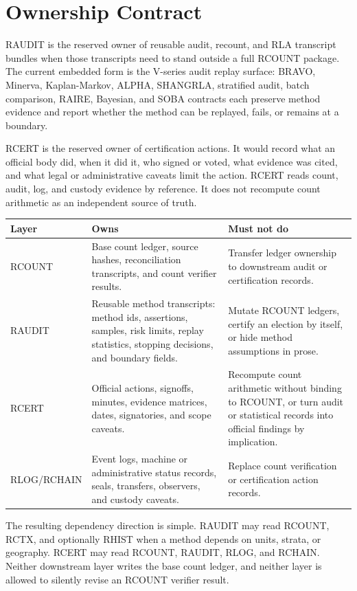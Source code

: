 \section{Ownership Contract}

RAUDIT is the reserved owner of reusable audit, recount, and RLA transcript
bundles when those transcripts need to stand outside a full RCOUNT package. The
current embedded form is the V-series audit replay surface: BRAVO, Minerva,
Kaplan-Markov, ALPHA, SHANGRLA, stratified audit, batch comparison, RAIRE,
Bayesian, and SOBA contracts each preserve method evidence and report whether
the method can be replayed, fails, or remains at a boundary.

RCERT is the reserved owner of certification actions. It would record what an
official body did, when it did it, who signed or voted, what evidence was cited,
and what legal or administrative caveats limit the action. RCERT reads count,
audit, log, and custody evidence by reference. It does not recompute count
arithmetic as an independent source of truth.

\begin{center}
\small
\begin{tabularx}{\textwidth}{lXX}
\toprule
Layer & Owns & Must not do \\
\midrule
RCOUNT & Base count ledger, source hashes, reconciliation transcripts, and count
verifier results. & Transfer ledger ownership to downstream audit or
certification records. \\
RAUDIT & Reusable method transcripts: method ids, assertions, samples, risk
limits, replay statistics, stopping decisions, and boundary fields. & Mutate
RCOUNT ledgers, certify an election by itself, or hide method assumptions in
prose. \\
RCERT & Official actions, signoffs, minutes, evidence matrices, dates,
signatories, and scope caveats. & Recompute count arithmetic without binding to
RCOUNT, or turn audit or statistical records into official findings by
implication. \\
RLOG/RCHAIN & Event logs, machine or administrative status records, seals,
transfers, observers, and custody caveats. & Replace count verification or
certification action records. \\
\bottomrule
\end{tabularx}
\end{center}

The resulting dependency direction is simple. RAUDIT may read RCOUNT, RCTX, and
optionally RHIST when a method depends on units, strata, or geography. RCERT may
read RCOUNT, RAUDIT, RLOG, and RCHAIN. Neither downstream layer writes the base
count ledger, and neither layer is allowed to silently revise an RCOUNT verifier
result.
